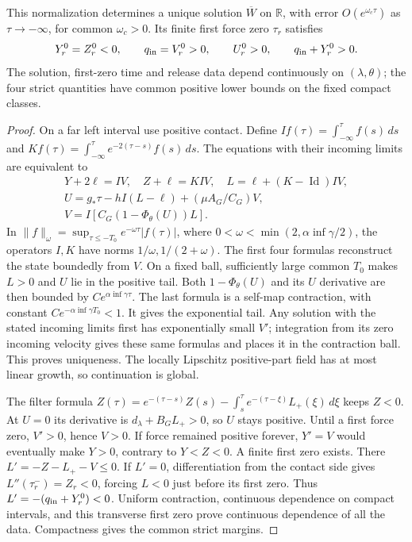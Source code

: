 \begin{lemma}
\label{lem:critical-pullback}
This normalization determines a unique solution $\overline W$ on
$\mathbb R$, with error $O(e^{\omega_c\tau})$ as $\tau\to-\infty$,
for common $\omega_c>0$. Its finite first force zero $\tau_r$ satisfies
\begin{equation}
 Y_r^0=Z_r^0<0,\qquad q_{\rm in}=V_r^0>0,\qquad U_r^0>0,
 \qquad q_{\rm in}+Y_r^0>0.
 \label{ent:critical-release-data}
\end{equation}
The solution, first-zero time and release data depend continuously
on $(\lambda,\theta)$; the four strict quantities have common
positive lower bounds on the fixed compact classes.
\end{lemma}
\begin{proof}
On a far left interval use positive contact. Define
$If(\tau)=\int_{-\infty}^{\tau}f(s)\,ds$ and
$Kf(\tau)=\int_{-\infty}^{\tau}e^{-2(\tau-s)}f(s)\,ds$.
The equations with their incoming limits are equivalent to
\[
 \begin{gathered}
 Y+2\ell=IV,\quad Z+\ell=KIV,\quad L=\ell+(K-\operatorname{Id})IV,
 \\
 U=g_*\tau-hI(L-\ell)+(\mu A_G/C_G)V,\\
 V=I[C_G(1-\Phi_\theta(U))L].
 \end{gathered}
\]
In $\|f\|_\omega=\sup_{\tau\le-T_0}e^{-\omega\tau}|f(\tau)|$,
where $0<\omega<\min(2,\alpha\inf\gamma/2)$, the operators
$I,K$ have norms $1/\omega,1/(2+\omega)$.
The first four formulas reconstruct the state boundedly from $V$.
On a fixed ball, sufficiently large common $T_0$ makes $L>0$ and
$U$ lie in the positive tail. Both $1-\Phi_\theta(U)$ and its
$U$ derivative are then bounded by $Ce^{\alpha\inf\gamma\tau}$.
The last formula is a self-map contraction, with constant
$Ce^{-\alpha\inf\gamma T_0}<1$. It gives the exponential tail.
Any solution with the stated incoming limits first has exponentially
small $V'$; integration from its zero incoming velocity gives these
same formulas and places it in the contraction ball. This proves
uniqueness. The locally Lipschitz positive-part field has at most
linear growth, so continuation is global.

The filter formula
$Z(\tau)=e^{-(\tau-s)}Z(s)-\int_s^\tau e^{-(\tau-\xi)}L_+(\xi)\,d\xi$
keeps $Z<0$. At $U=0$ its derivative is $d_\lambda+B_GL_+>0$, so $U$
stays positive. Until a first force zero, $V'>0$, hence $V>0$.
If force remained positive forever, $Y'=V$ would eventually make
$Y>0$, contrary to $Y<Z<0$. A finite first zero exists.
There $L'=-Z-L_+-V\le0$. If $L'=0$, differentiation from the
contact side gives $L''(\tau_r^-)=Z_r<0$, forcing $L<0$ just
before its first zero. Thus $L'=-(q_{\rm in}+Y_r^0)<0$.
Uniform contraction, continuous dependence on compact intervals,
and this transverse first zero prove continuous dependence of all
the data. Compactness gives the common strict margins.
\end{proof}

